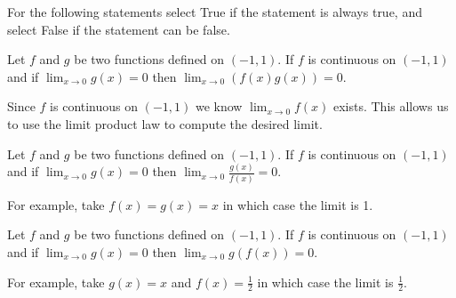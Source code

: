 \documentclass{ximera}
\author{Nela Lakos \and Kyle Parsons}
\begin{document}
\begin{exercise}

For the following statements select True if the statement is always true, and select False if the statement can be false.

Let $f$ and $g$ be two functions defined on $\left(-1,1\right)$. If $f$ is continuous on $\left(-1,1\right)$ and if $\displaystyle \lim_{x\to0}g(x)=0$ then $\displaystyle  \lim_{x\to0}\left(f(x)g(x)\right) = 0$.

\begin{multipleChoice}
\end{multipleChoice}

\begin{feedback}
Since $f$ is continuous on $\left(-1,1\right)$ we know $\displaystyle \lim_{x\to0}f(x)$ exists.  This allows us to use the limit product law to compute the desired limit.
\end{feedback}

\begin{exercise}

Let $f$ and $g$ be two functions defined on $\left(-1,1\right)$. If $f$ is continuous on $\left(-1,1\right)$ and if $\displaystyle \lim_{x\to0}g(x)=0$ then $\displaystyle \lim_{x\to0}\frac{g(x)}{f(x)} = 0$.

\begin{multipleChoice}
\end{multipleChoice}

\begin{feedback}
	For example, take $f(x) = g(x) = x$ in which case the limit is 1.
\end{feedback}

\begin{exercise}

Let $f$ and $g$ be two functions defined on $\left(-1,1\right)$. If $f$ is continuous on $\left(-1,1\right)$ and if $\displaystyle \lim_{x\to0}g(x)=0$ then $\displaystyle \lim_{x\to0}g(f(x)) = 0$.

\begin{multipleChoice}
\end{multipleChoice}

\begin{feedback}
For example, take $g(x) = x$ and $f(x) = \frac{1}{2}$ in which case the limit is $\frac{1}{2}$.
\end{feedback}

\begin{exercise}


\end{exercise}
\end{exercise}
\end{exercise}
\end{exercise}
\end{document}
